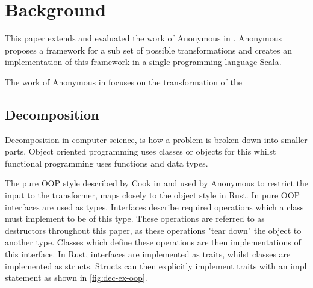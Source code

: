 \documentclass[ oneside,%
                    author={James Elgar},
                    degree={MEng},
                     title={Bidirectional transformer between functional and \\ object-oriented programming in Rust},
                  subtitle={}]{dissertation}
\newcommand{\weixin}{Anonymous }
\begin{document}



\chapter{Background}
\label{chap:technical}


This paper extends and evaluated the work of \weixin in \cite{food}. \weixin proposes a framework for a sub set of possible transformations and creates an implementation of this framework in a single programming language Scala. 

The work of \weixin in \cite{food} focuses on the transformation of the

\section{Decomposition}

Decomposition in computer science, is how a problem is broken down into smaller parts. Object oriented programming uses classes or objects for this whilst functional programming uses functions and data types.

The pure OOP style described by Cook in \cite{cook} and used by \weixin to restrict the input to the transformer, maps closely to the object style in Rust. In pure OOP interfaces are used as types. Interfaces describe required operations which a class must implement to be of this type. These operations are referred to as destructors throughout this paper, as these operations "tear down" the object to another type. Classes which define these operations are then implementations of this interface. In Rust, interfaces are implemented as traits, whilst classes are implemented as structs. Structs can then explicitly implement traits with an impl statement as shown in \autoref{fig:dec-ex-oop}. 
\end{document}
